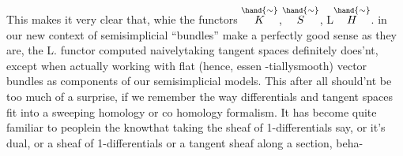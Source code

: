 \margin{$\ulcorner$} This makes it very clear that, whie the functors $\overset{\hand{\sim}}{K}$,$\overset{\hand{\sim}}{S}$, L$\overset{\hand{\sim}}{H}$. in our
new context of semisimplicial ``bundles'' make a perfectly good sense as
they are, the L\hand{$\Pi$}. functor computed naively\hand{(}taking tangent spaces\hand{)}
definitely does'nt, except when actually working with flat (hence, essen%
-tiallysmooth) vector bundles as components of our semisimplicial models.
This after all should'nt be too much of a surprise, if we remember the
way differentials and tangent spaces fit into a sweeping homology or co%
homology formalism. It has become  quite familiar to peoplein the
knowthat taking the sheaf of 1-differentials say, or it's dual, or
 a sheaf of 1-differentials or a tangent sheaf along a section, beha-%


